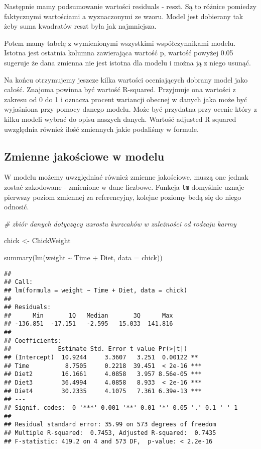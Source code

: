 \documentclass[
]{book}
\newenvironment{Shaded}{\begin{snugshade}}{\end{snugshade}}
\newcommand{\AttributeTok}[1]{\textcolor[rgb]{0.77,0.63,0.00}{#1}}
\newcommand{\CommentTok}[1]{\textcolor[rgb]{0.56,0.35,0.01}{\textit{#1}}}
\newcommand{\FunctionTok}[1]{\textcolor[rgb]{0.00,0.00,0.00}{#1}}
\newcommand{\NormalTok}[1]{#1}
\newcommand{\OtherTok}[1]{\textcolor[rgb]{0.56,0.35,0.01}{#1}}
\newcommand{\SpecialCharTok}[1]{\textcolor[rgb]{0.00,0.00,0.00}{#1}}
\begin{document}
Następnie mamy podsumowanie wartości residuals - reszt. Są to różnice pomiedzy faktycznymi wartościami a wyznaczonymi ze wzoru. Model jest dobierany tak żeby suma kwadratów reszt była jak najmniejsza.

Potem mamy tabelę z wymienionymi wszystkimi współczynnikami modelu. Istotna jest ostatnia kolumna zawierająca wartość p, wartość powyżej 0.05 sugeruje że dana zmienna nie jest istotna dla modelu i można ją z niego usunąć.

Na końcu otrzymujemy jeszcze kilka wartości oceniających dobrany model jako całość. Znajoma powinna być wartość R-squared. Przyjmuje ona wartości z zakresu od 0 do 1 i oznacza procent wariancji obecnej w danych jaka może być wyjaśniona przy pomocy danego modelu. Może być przydatna przy ocenie który z kilku modeli wybrać do opisu naszych danych. Wartość adjusted R squared uwzględnia również ilość zmiennych jakie podaliśmy w formule.

\hypertarget{zmienne-jakoux15bciowe-w-modelu}{%
\subsection{Zmienne jakościowe w modelu}\label{zmienne-jakoux15bciowe-w-modelu}}

W modelu możemy uwzględniać również zmienne jakościowe, muszą one jednak zostać zakodowane - zmienione w dane liczbowe. Funkcja \texttt{lm} domyślnie uznaje pierwszy poziom zmiennej za referencyjny, kolejne poziomy bedą się do niego odnosić.

\begin{Shaded}
\begin{Highlighting}[]
\CommentTok{\# zbiór danych dotyczący wzrostu kurzcaków w zależności od rodzaju karmy}

\NormalTok{chick }\OtherTok{\textless{}{-}}\NormalTok{ ChickWeight}

\FunctionTok{summary}\NormalTok{(}\FunctionTok{lm}\NormalTok{(weight }\SpecialCharTok{\textasciitilde{}}\NormalTok{ Time }\SpecialCharTok{+}\NormalTok{ Diet, }\AttributeTok{data =}\NormalTok{ chick))}
\end{Highlighting}
\end{Shaded}

\begin{verbatim}
## 
## Call:
## lm(formula = weight ~ Time + Diet, data = chick)
## 
## Residuals:
##      Min       1Q   Median       3Q      Max 
## -136.851  -17.151   -2.595   15.033  141.816 
## 
## Coefficients:
##             Estimate Std. Error t value Pr(>|t|)    
## (Intercept)  10.9244     3.3607   3.251  0.00122 ** 
## Time          8.7505     0.2218  39.451  < 2e-16 ***
## Diet2        16.1661     4.0858   3.957 8.56e-05 ***
## Diet3        36.4994     4.0858   8.933  < 2e-16 ***
## Diet4        30.2335     4.1075   7.361 6.39e-13 ***
## ---
## Signif. codes:  0 '***' 0.001 '**' 0.01 '*' 0.05 '.' 0.1 ' ' 1
## 
## Residual standard error: 35.99 on 573 degrees of freedom
## Multiple R-squared:  0.7453, Adjusted R-squared:  0.7435 
## F-statistic: 419.2 on 4 and 573 DF,  p-value: < 2.2e-16
\end{verbatim}
\end{document}
